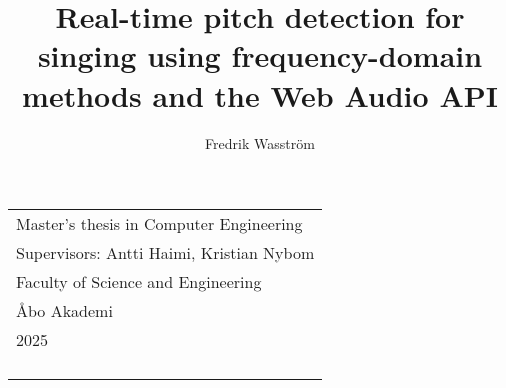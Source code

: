 
\begin{titlepage}
\setlength{\droptitle}{8em}
\title{\Huge\bfseries Real-time pitch detection for singing using frequency-domain methods and the Web Audio API}
\author{Fredrik Wasström}
\date{}
\maketitle
\enlargethispage{3cm}
\vfill
{\selectfont
\hfill
\begin{tabular}[t]{l@{}}
Master's thesis in Computer Engineering\\ 
Supervisors: Antti Haimi, Kristian Nybom \\
Faculty of Science and Engineering \\
Åbo Akademi\\ 
2025\\ 
\\
\\
\\
\\
\end{tabular}
}
\end{titlepage}

